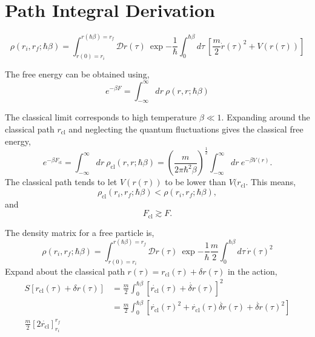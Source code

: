 \chapter{Path Integral Derivation}
\label{appx:first}

\begin{equation}
    \rho(r_i, r_f; \hbar\beta) = \int_{r(0)=r_i}^{r(\hbar\beta)=r_f} \mathcal{D}r(\tau)\ \exp{-\frac{1}{\hbar}\int_0^{\hbar\beta}d\tau\ \left[\frac{m}{2} \dot{r}(\tau)^2 + V(r(\tau))\right]}
\end{equation}

The free energy can be obtained using,
\begin{equation}
    e^{-\beta F} = \int_{-\infty}^{\infty} dr\ \rho(r, r; \hbar\beta)
\end{equation}

The classical limit corresponds to high temperature $\beta \ll 1$. Expanding around the classical path $r_{\text{cl}}$ and neglecting the quantum fluctuations gives the classical free energy,
\begin{equation}
    e^{-\beta F_{\text{cl}}} = \int_{-\infty}^{\infty} dr\ \rho_{\text{cl}}(r, r; \hbar\beta) = \left(\frac{m}{2\pi\hbar^2\beta}\right)^{\frac{1}{2}} \int_{-\infty}^{\infty} dr\ e^{-\beta V(r)}.
\end{equation}
The classical path tends to let $V(r(\tau))$ to be lower than $V(r_{\text{cl}}$. This means,
\begin{equation}
    \rho_{\text{cl}}(r_i,r_f;\hbar\beta) < \rho(r_i,r_f;\hbar\beta),
\end{equation}
and
\begin{equation}
    F_{\text{cl}} \gtrsim F.
\end{equation}

The density matrix for a free particle is,
\begin{equation}
    \rho(r_i, r_f; \hbar\beta) = \int_{r(0)=r_i}^{r(\hbar\beta)=r_f} \mathcal{D}r(\tau)\ \exp{-\frac{1}{\hbar}\frac{m}{2}\int_0^{\hbar\beta}d\tau\ \dot{r}(\tau)^2}
\end{equation}
Expand about the classical path $r(\tau) = r_{\text{cl}}(\tau) + \delta r(\tau)$ in the action,
\begin{equation}
\begin{aligned}
    S[r_{\text{cl}}(\tau) + \delta r(\tau)] &= \frac{m}{2} \int_0^{\hbar\beta} \left[ \dot{r_{\text{cl}}}(\tau) + \dot{\delta r}(\tau) \right]^2 \\
    &= \frac{m}{2} \int_0^{\hbar\beta} \left[\dot{r_{\text{cl}}}(\tau)^2 + \dot{r_{\text{cl}}}(\tau) \dot{\delta r}(\tau) + \dot{\delta r}(\tau)^2 \right] \\
    \frac{m}{2} \left[ 2 \dot{r_{\text{cl}}} \right]_{r_i}^{r_f}
\end{aligned}
\end{equation}

